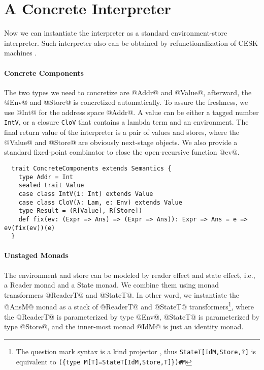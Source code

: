 
\section{A Concrete Interpreter} \label{unstaged_conc}

Now we can instantiate the interpreter as a standard environment-store
interpreter. Such interpreter also can be obtained by refunctionalization of
CESK machines \cite{Felleisen:1987:CAH:41625.41654, DBLP:conf/ppdp/AgerBDM03}.

\paragraph{Concrete Components}
The two types we need to concretize are @Addr@ and @Value@, afterward, the @Env@
and @Store@ is concretized automatically. To assure the freshness, we use @Int@
for the address space @Addr@. A value can be either a tagged number
\texttt{IntV}, or a closure \texttt{CloV} that contains a lambda term and an
environment. The final return value of the interpreter is a pair of values and
stores, where the @Value@ and @Store@ are obviously next-stage objects. We also
provide a standard fixed-point combinator to close the open-recursive function @ev@.

\begin{lstlisting}
  trait ConcreteComponents extends Semantics {
    type Addr = Int
    sealed trait Value
    case class IntV(i: Int) extends Value
    case class CloV(λ: Lam, e: Env) extends Value
    type Result = (R[Value], R[Store])
    def fix(ev: (Expr => Ans) => (Expr => Ans)): Expr => Ans = e => ev(fix(ev))(e)
  }
\end{lstlisting}

\paragraph{Unstaged Monads}
The environment and store can be modeled by reader effect and state effect,
i.e., a Reader monad and a State monad. We combine them using monad transformers
@ReaderT@ and @StateT@.
In other word, we instantiate the @AnsM@ monad as a stack of @ReaderT@ and @StateT@
transformers\footnote{The question mark syntax is a kind projector
  \cite{kindprojector}, thus \texttt{StateT[IdM,Store,?]} is equivalent to \newline
  \texttt{(\{type M[T]=StateT[IdM,Store,T]\})\#M}}, where the @ReaderT@ is
parameterized by type @Env@, @StateT@ is parameterized by type @Store@, and the
inner-most monad @IdM@ is just an identity monad.


